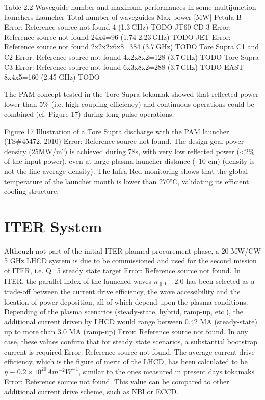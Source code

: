 Table 2.2 Waveguide number and maximum performances in some multijunction launchers 
Launcher
Total number of waveguides
Max power [MW]
Petula-B Error: Reference source not found
4 (1.3 GHz)
TODO
JT60 CD-3 Error: Reference source not found
24x4=96 (1.74-2.23 GHz)
TODO
JET Error: Reference source not found
2x2x2x6x8=384 (3.7 GHz)
TODO
Tore Supra C1 and C2 Error: Reference source not found
4x2x8x2=128 (3.7 GHz)
TODO
Tore Supra C3 Error: Reference source not found
6x3x8x2=288 (3.7 GHz)
TODO
EAST
8x4x5=160 (2.45 GHz)
TODO

The PAM concept tested in the Tore Supra tokamak showed that reflected power lower than 5\% (i.e. high coupling efficiency) and continuous operations could be combined (cf. Figure 17) during long pulse operations. 

Figure 17 Illustration of a Tore Supra discharge with the PAM launcher (TS\#45472, 2010) Error: Reference source not found. The design goal power density (25MW/m²) is achieved during 78s, with very low reflected power (<2\% of the input power), even at large plasma launcher distance (~10 cm) (density is not the line-average density). The Infra-Red monitoring shows that the global temperature of the launcher mouth is lower than 270°C, validating its efficient cooling structure.

\section{ITER System}

Although not part of the initial ITER planned procurement phase, a 20 MW/CW 5 GHz LHCD system is due to be commissioned and used for the second mission of ITER, i.e. Q=5 steady state target Error: Reference source not found. In ITER, the parallel index of the launched waves $n_{\parallel 0}$ ~ 2.0 has been selected as a trade-off between the current drive efficiency, the wave accessibility and the location of power deposition, all of which depend upon the plasma conditions. Depending of the plasma scenarios (steady-state, hybrid, ramp-up, etc.), the additional current driven by LHCD would range between 0.42 MA (steady-state) up to more than 3.0 MA (ramp-up) Error: Reference source not found. In any case, these values confirm that for steady state scenarios, a substantial bootstrap current is required Error: Reference source not found. The average current drive efficiency, which is the figure of merit of the LHCD, has been calculated to be $\eta \equiv 0.2 \times 10^{20} A m^{−2} W^{-1}$, similar to the ones measured in present days tokamaks Error: Reference source not found. This value can be compared to other additional current drive scheme, such as NBI or ECCD. 

